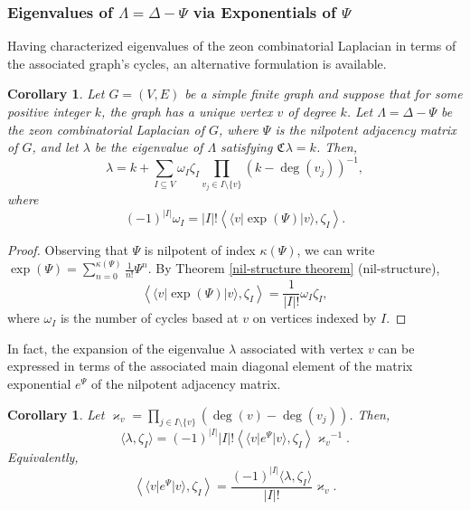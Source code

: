 \documentclass{article}
\newtheorem{corollary}[theorem]{Corollary}
\theoremstyle{definition}
\newcommand{\zco}{\mathfrak{C}\mspace{1mu}}
\numberwithin{equation}{section}
\begin{document}
\subsubsection{Eigenvalues of $\Lambda=\Delta-\Psi$ via Exponentials of $\Psi$}

Having characterized eigenvalues of the zeon combinatorial Laplacian in terms of the associated graph's cycles, an alternative formulation is available.  

\begin{corollary}
Let $G=(V,E)$ be a simple finite graph and suppose that for some positive integer $k$, the graph has a unique vertex $v$ of degree $k$.  Let $\Lambda=\Delta-\Psi$ be the zeon combinatorial Laplacian of $G$, where $\Psi$ is the nilpotent adjacency matrix of $G$,  and let $\lambda$ be the eigenvalue of $\Lambda$ satisfying $\zco \lambda =k$.  Then,
\begin{equation*}
\lambda = k + \sum_{I\subseteq V}\omega_I\zeta_{I}\prod_{v_j\in I\setminus\{v\}}(k-\deg(v_j))^{-1},
\end{equation*}
where \begin{equation*}
(-1)^{|I|}\omega_I=|I|!\left< \langle v\vert \exp(\Psi)\vert v\rangle,\zeta_I\right>.
\end{equation*}
\end{corollary}


\begin{proof}
Observing that $\Psi$ is nilpotent of index $\kappa(\Psi)$, we can write \hfill\break $
\exp(\Psi)=\displaystyle\sum_{n=0}^{\kappa(\Psi)}\frac{1}{n!}\Psi^n.$
By Theorem \ref{nil-structure theorem} (nil-structure), \begin{equation*}
\left< \langle v\vert \exp(\Psi)\vert v\rangle,\zeta_I\right>=\frac{1}{|I|!}\omega_I\zeta_I,
\end{equation*}
where $\omega_I$ is the number of cycles based at $v$ on vertices indexed by $I$.
\end{proof}

In fact, the expansion of the eigenvalue $\lambda$ associated with vertex $v$ can be expressed in terms of the associated main diagonal element of the matrix exponential $e^\Psi$ of the nilpotent adjacency matrix.

\begin{corollary}\label{lambda from Psi}
Let $\varkappa_v=\prod_{j\in I\setminus\{v\}}(\deg(v)-\deg(v_j))$.  Then,
\begin{equation}
\langle \lambda, \zeta_I\rangle=(-1)^{|I|}|I|!\left<\langle v\vert e^\Psi \vert v\rangle,\zeta_I\right>{\varkappa_v}^{-1}.
\end{equation}
Equivalently,
\begin{equation}
\left<\langle v\vert e^\Psi \vert v\rangle,\zeta_I\right>=\frac{(-1)^{|I|}\langle \lambda, \zeta_I\rangle}{|I|!}\varkappa_v.
\end{equation} 
\end{corollary}
\end{document}
